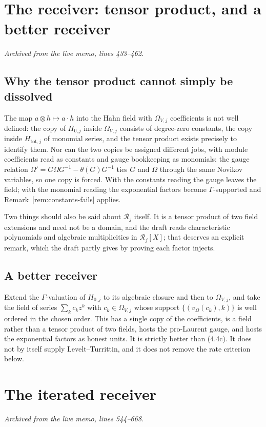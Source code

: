 \documentclass[11pt]{article}
\theoremstyle{definition}
\theoremstyle{remark}
\begin{document}
\section{The receiver: tensor product, and a better receiver}
\noindent\emph{Archived from the live memo, lines 433--462.}

\subsection*{Why the tensor product cannot simply be dissolved}

The map $a\otimes h\mapsto a\cdot h$ into the Hahn field with $\Omega_{V,j}$
coefficients is not well defined: the copy of $H_{0,j}$ inside $\Omega_{V,j}$
consists of degree-zero constants, the copy inside $H_{\mathrm{tot},j}$ of
monomial series, and the tensor product exists precisely to identify them. Nor
can the two copies be assigned different jobs, with module coefficients read as
constants and gauge bookkeeping as monomials: the gauge relation
$\Omega'=G\Omega G^{-1}-\theta(G)G^{-1}$ ties $G$ and $\Omega$ through the same
Novikov variables, so one copy is forced. With the constants reading the gauge
leaves the field; with the monomial reading the exponential factors become
$\Gamma$-supported and Remark~\textup{[rem:constants-fails]} applies.

Two things should also be said about $\mathscr R_j$ itself. It is a tensor
product of two field extensions and need not be a domain, and the draft reads
characteristic polynomials and algebraic multiplicities in $\mathscr R_j[X]$;
that deserves an explicit remark, which the draft partly gives by proving each
factor injects.

\subsection*{A better receiver}

Extend the $\Gamma$-valuation of $H_{0,j}$ to its algebraic closure and then to
$\Omega_{V,j}$, and take the field of series $\sum_kc_kz^k$ with
$c_k\in\Omega_{V,j}$ whose support $\{(v_\Omega(c_k),k)\}$ is well ordered in
the chosen order. This has a single copy of the coefficients, is a field rather
than a tensor product of two fields, hosts the pro-Laurent gauge, and hosts the
exponential factors as honest units. It is strictly better than (4.4c). It does
not by itself supply Levelt--Turrittin, and it does not remove the rate
criterion below.


\section{The iterated receiver}
\noindent\emph{Archived from the live memo, lines 544--668.}
\end{document}
